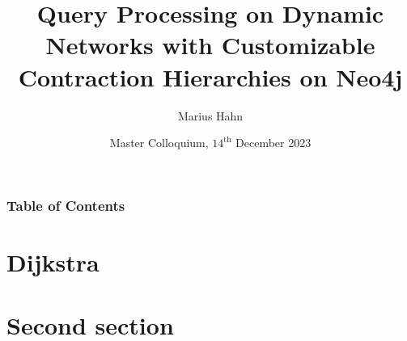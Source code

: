 \documentclass[xcolor={dvipsnames}]{beamer}
\title[CCH in Neo4j] %
{Query Processing on Dynamic Networks with Customizable Contraction Hierarchies on Neo4j}
\author[Marius Hahn] %
{Marius Hahn}
\institute[CIS] %
{
  Grouf of Database and Information Systems \\
  Department of Computer and Information Science \\
  Faculty of Sciences \\
  Universität Konstanz
}
\date[$\text{14}^{\text{th}}$ December 2023] %
{Master Colloquium, $\text{14}^{\text{th}}$ December 2023}
\begin{document}
\frame{\titlepage}


\begin{frame}
\frametitle{Table of Contents}
\tableofcontents
\end{frame}




\section{Dijkstra}













\section{Second section}


\end{document}

